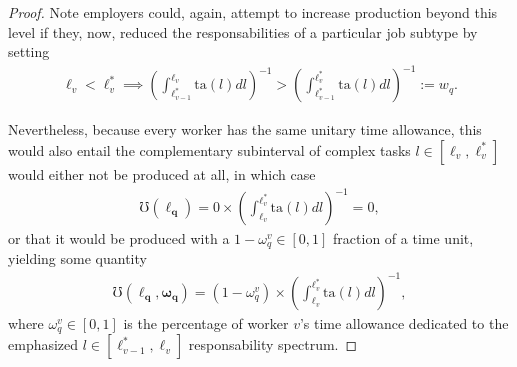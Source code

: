 \documentclass[hidelinks, nonatbib]{elsarticle}
\begin{document}
\begin{lemma}
\begin{proof}
        Note employers could, again, attempt to increase production beyond this level if they, now, reduced the responsabilities of a particular job subtype by setting
        \begin{align}
        \ell_v < \ell_{v}^{*}
        \implies
            \left(
                \int_{
                    \ell_{v-1}^{*}
                }^{
                    \ell_{v}
                }
                \text{ta}(l)dl
            \right) ^ {-1}
            >
            \left(
                \int_{
                    \ell_{v-1}^{*}
                }^{
                    \ell_{v}^{*}
                }
                \text{ta}(l)dl
            \right) ^ {-1}
            :=
            w_q
            .
        \end{align}
        
        Nevertheless, because every worker has the same unitary time allowance, this would also entail the complementary subinterval of complex tasks $l \in [\ell_{v}, \ell_{v}^{*}]$ would either not be produced at all, in which case
        \begin{align}
            \mho(\boldsymbol{\ell_{q}})
            =
            0
            \times
            \left(
                \int_{
                    \ell_{v}
                }^{
                    \ell_{v}^{*}
                }
                \text{ta}(l)dl
            \right) ^ {-1}
            =
            0
            ,
        \end{align}
        or that it would be produced with a $1 - \omega_{q}^{v} \in [0,1]$ fraction of a time unit, yielding some quantity
        \begin{align}
            \mho(
                \boldsymbol{\ell_{q}}
                ,\boldsymbol{\omega_{q}}
            )
            =
            (1 - \omega_{q}^{v})
            \times
            \left(
                \int_{
                    \ell_{v}
                }^{
                    \ell_{v}^{*}
                }
                \text{ta}(l)dl
            \right) ^ {-1}
            ,
        \end{align}
        where $\omega_{q}^{v} \in [0,1]$ is the percentage of worker $v$'s time allowance dedicated to the emphasized $l \in [\ell_{v-1}^{*}, \ell_{v}]$ responsability spectrum.
        

\end{proof}
\end{lemma}
\end{document}
